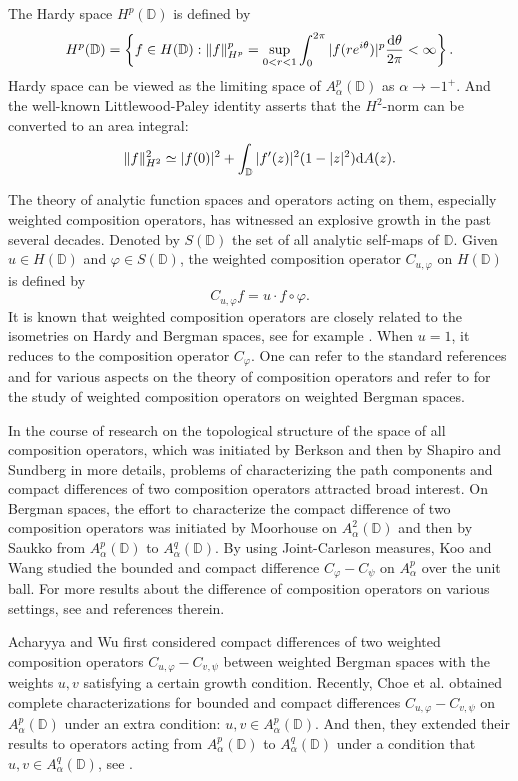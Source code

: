 \documentclass[preprint,12pt,times]{elsarticle}
\theoremstyle{definition}
\theoremstyle{remark}
\numberwithin{equation}{section}
\begin{document}
The Hardy space $H^p(\mathbb{D})$ is defined by 
\[H^p(\mathbb{D})=\left\{f\in H(\mathbb{D}): \|f\|_{H^p}^p=\sup_{0<r<1}\int_{0}^{2\pi}|f(re^{i\theta})|^p\frac{{\rm d}\theta}{2\pi}<\infty\right\}.\]
Hardy space can be viewed as the limiting space of $A_{\alpha}^p(\mathbb{D})$ as $\alpha\to -1^+$. And the well-known Littlewood-Paley identity asserts that the $H^2$-norm can be converted to an area integral:
\begin{equation}\label{equa1.1}
\|f\|_{H^2}^2\simeq |f(0)|^2+\int_{\mathbb{D}}|f'(z)|^2(1-|z|^2){\rm d}A(z).
\end{equation}

The theory of analytic function spaces and operators acting on them, especially weighted composition operators, has witnessed an explosive growth in the past several decades. Denoted by $S(\mathbb{D})$ the set of all analytic self-maps of $\mathbb{D}$. Given $u\in H(\mathbb{D})$ and $\varphi\in S(\mathbb{D})$, the weighted composition operator $C_{u,\varphi}$ on $H(\mathbb{D})$ is defined by
\[C_{u,\varphi}f=u\cdot f\circ\varphi.\]
It is known that weighted composition operators are closely related to the isometries on Hardy and Bergman spaces, see for example \cite{13,14}. When $u=1$, it reduces to the composition operator $C_{\varphi}$. One can refer to the standard references \cite{9} and \cite{23} for various aspects on the theory of composition operators and refer to \cite{10,11} for the study of weighted composition operators on weighted Bergman spaces.

In the course of research on the topological structure of the space of all composition operators, which was initiated by Berkson \cite{2} and then by Shapiro and Sundberg \cite{24} in more details, problems of characterizing the path components and compact differences of two composition operators attracted broad interest. On Bergman spaces, the effort to characterize the compact difference of two composition operators was initiated by Moorhouse \cite{19} on $A_{\alpha}^2(\mathbb{D})$ and then by Saukko \cite{21, 22} from $A_{\alpha}^p(\mathbb{D})$ to $A_{\alpha}^q(\mathbb{D})$. By using Joint-Carleson measures, Koo and Wang \cite{15} studied the bounded and compact difference $C_{\varphi}-C_{\psi}$ on $A_{\alpha}^p$ over the unit ball. For more results about the difference of composition operators on various settings, see \cite{7,8,26} and references therein. 

Acharyya and Wu \cite{1} first considered compact differences of two weighted composition operators $C_{u,\varphi}-C_{v,\psi}$ between weighted Bergman spaces with the weights $u,v$ satisfying a certain growth condition. Recently, Choe et al. \cite{4} obtained complete characterizations for bounded and compact differences $C_{u,\varphi}-C_{v,\psi}$ on $A_{\alpha}^p(\mathbb{D})$ under an extra condition: $u,v\in A_{\alpha}^p(\mathbb{D})$. And then, they extended their results to operators acting from $A_{\alpha}^p(\mathbb{D})$ to $A_{\alpha}^q(\mathbb{D})$ under a condition that $u,v\in A_{\alpha}^q(\mathbb{D})$, see \cite{5}.
\end{document}

